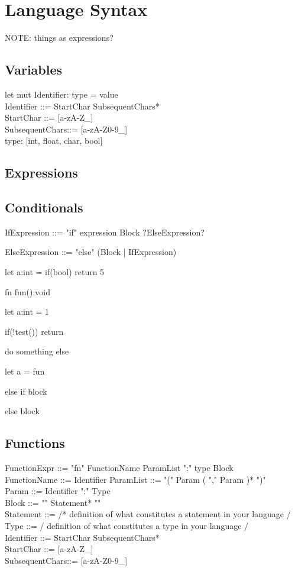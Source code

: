 \section{Language Syntax}
\label{sec:syntax}
NOTE: things as expressions?
\subsection{Variables}

let mut Identifier: type = value\\

Identifier ::= StartChar SubsequentChars*\\
StartChar      ::= [a-zA-Z\_]\\
SubsequentChars::= [a-zA-Z0-9\_]\\

type: [int, float, char, bool]

\subsection{Expressions}


\subsection{Conditionals}

IfExpression ::= "if" expression Block ?ElseExpression?

ElseExpression ::= "else" (Block | IfExpression)

let a:int = if(bool) return 5

fn fun():void{

 let a:int = 1
 
 if(!test()) {return }
 
 do something else
 

}





let a = fun

else if block

else block




\subsection{Functions}
FunctionExpr      ::= "fn" FunctionName ParamList ":" type Block\\
FunctionName	  ::= Identifier
ParamList         ::= "(" Param ( "," Param )* ")"\\
Param             ::= Identifier ":" Type\\
Block             ::= "{" Statement* "}"\\
Statement         ::= /* definition of what constitutes a statement in your language /\\
Type              ::= / definition of what constitutes a type in your language /\\
Identifier ::= StartChar SubsequentChars*\\
StartChar      ::= [a-zA-Z\_]\\
SubsequentChars::= [a-zA-Z0-9\_]\\

